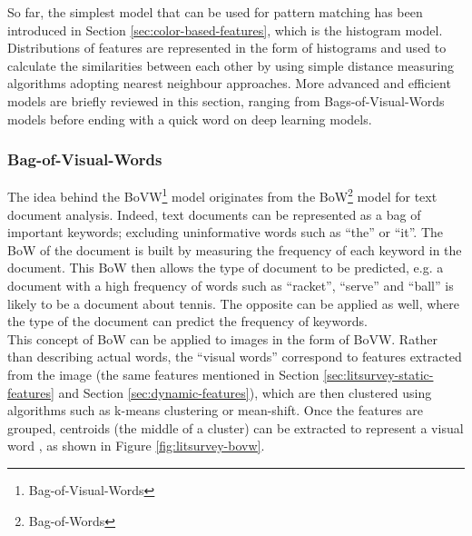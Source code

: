 So far, the simplest model that can be used for pattern matching has been introduced in Section \ref{sec:color-based-features}, which is the histogram model. Distributions of features are represented in the form of histograms and used to calculate the similarities between each other by using simple distance measuring algorithms adopting nearest neighbour approaches. More advanced and efficient models are briefly reviewed in this section, ranging from Bags-of-Visual-Words models before ending with a quick word on deep learning models.

\subsubsection{Bag-of-Visual-Words}

The idea behind the BoVW\footnote{Bag-of-Visual-Words} model originates from the BoW\footnote{Bag-of-Words} model for text document analysis. Indeed, text documents can be represented as a bag of important keywords; excluding uninformative words such as ``the'' or ``it''. The BoW of the document is built by measuring the frequency of each keyword in the document. This BoW then allows the type of document to be predicted, e.g. a document with a high frequency of words such as ``racket'', ``serve'' and ``ball'' is likely to be a document about tennis. The opposite can be applied as well, where the type of the document can predict the frequency of keywords.\\

This concept of BoW can be applied to images in the form of BoVW. Rather than describing actual words, the ``visual words'' correspond to features extracted from the image (the same features mentioned in Section \ref{sec:litsurvey-static-features} and Section \ref{sec:dynamic-features}), which are then clustered using algorithms such as k-means clustering or mean-shift. Once the features are grouped, centroids (the middle of a cluster) can be extracted to represent a visual word \cite{yang2007bovw}, as shown in Figure \ref{fig:litsurvey-bovw}.\\

